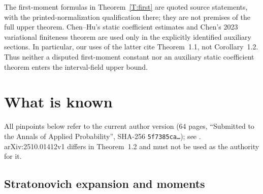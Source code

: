 \documentclass[12pt]{article}
\numberwithin{equation}{section}
\theoremstyle{definition}
\begin{document}
The first-moment formulas in Theorem~\ref{T:first} are quoted source
statements, with the printed-normalization qualification there; they are
not premises of the full upper theorem. Chen--Hu's static coefficient
estimates and Chen's 2023 variational finiteness theorem are used only in
the explicitly identified auxiliary sections. In particular, our uses of
the latter cite Theorem~1.1, not Corollary~1.2. Thus neither a disputed
first-moment constant nor an auxiliary static coefficient theorem enters
the interval-field upper bound.

\section{What is known}\label{S:known}

All pinpoints below refer to the current author version
\cite{chen:author2026:time-dependency} (64 pages, ``Submitted to the Annals
of Applied Probability'', SHA-256 \texttt{5f7385ca\dots}); see
. arXiv:2510.01412v1
\cite{chen:25:time-dependency} differs in Theorem~1.2 and must not be used as
the authority for it.

\subsection{Stratonovich expansion and moments}
\end{document}
